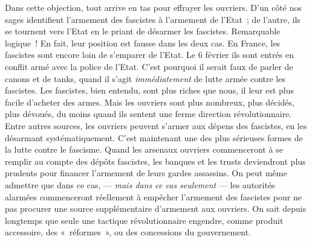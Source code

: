 \documentclass[french,twoside]{book} %
\begin{document}
Dans cette objection, tout arrive en tas pour effrayer les ouvriers. D’un côté nos sages identifient l’armement des fascistes à l’armement de l’Etat ; de l’autre, ils se tournent vers l’Etat en le priant de désarmer les fascistes. Remarquable logique ! En fait, leur position est fausse dans les deux cas. En France, les fascistes sont encore loin de s’emparer de l’Etat. Le 6 février ils sont entrés en conflit armé avec la police de l’Etat. C’est pourquoi il serait faux de parler de canons et de tanks, quand il s’agit \emph{immédiatement} de lutte armée contre les fascistes. Les fascistes, bien entendu, sont plus riches que nous, il leur est plus facile d’acheter des armes. Mais les ouvriers sont plus nombreux, plus décidés, plus dévoués, du moins quand ils sentent une ferme direction révolutionnaire. Entre autres sources, les ouvriers peuvent s’armer aux dépens des fascistes, en les désarmant systématiquement. C’est maintenant une des plus sérieuses formes de la lutte contre le fascisme. Quand les arsenaux ouvriers commenceront à se remplir au compte des dépôts fascistes, les banques et les trusts deviendront plus prudents pour financer l’armement de leurs gardes assassins. On peut même admettre que dans ce cas, — \emph{mais dans ce cas seulement} — les autorités alarmées commenceront réellement à empêcher l’armement des fascistes pour ne pas procurer une source supplémentaire d’armement aux ouvriers. On sait depuis longtemps que seule une tactique révolutionnaire engendre, comme produit accessoire, des « réformes », ou des concessions du gouvernement.\par
\end{document}
